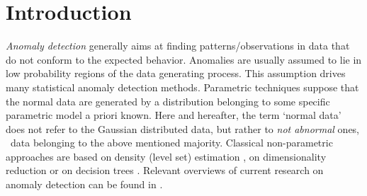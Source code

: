 \section{Introduction}
\label{ocrf:sec:intro}
\textit{Anomaly detection} generally aims at finding patterns/observations in data
that do not conform to the expected behavior.
Anomalies are usually assumed to lie in low probability regions of the data generating
process.
%
This assumption drives many statistical anomaly detection methods. %
Parametric techniques \citep{Barnett94, Eskin2000} suppose that
the normal data are generated by a distribution belonging to some specific
parametric model a priori known.
%
Here and hereafter, the term `normal data' does not refer to the Gaussian
distributed data, but rather to \emph{not abnormal} ones, \ie~data belonging to the
above mentioned majority.
%
Classical non-parametric approaches are based on density (level set) estimation
\citep{Scholkopf2001, Scott2006, Breunig2000LOF, Quinn2014},
on dimensionality reduction \citep{Shyu2003, Aggarwal2001} or on decision trees
\citep{Liu2008, Shi2012}.
%
Relevant overviews of current research on anomaly detection can be found in
\cite{Hodge2004survey, Chandola2009survey, Patcha2007survey, Markou2003survey}.

